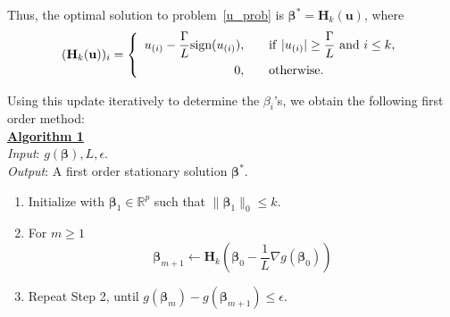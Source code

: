 \documentclass[12pt]{article}
\newcommand{\M}{\mathbf}
\newcommand{\MS}{\boldsymbol}
\newcommand{\R}{\mathbb{R}}
\newcommand{\1}{\mathds{1}}
\begin{document}
Thus, the optimal solution to problem~\ref{u_prob} is $\MS \beta^* = \M H_k(\M u)$, where
\begin{equation}
(\M H_k(\M u))_i = \left\{\begin{array}{rl} 
u_{(i)} - \displaystyle \frac{\Gamma}{L}\text{sign}(u_{(i)}), &~~~{\rm if}~|u_{(i)}| \ge \displaystyle \frac{\Gamma}{L}~{\rm and}~i \le k, \vspace{5pt}\\
0, &~~~\rm{otherwise.}
\end{array} \right.
\end{equation}

Using this update iteratively to determine the $\beta_i$'s, we obtain the following first order method:\\

\underline{\bf Algorithm 1}\\

\emph{Input}: $g(\MS \beta), L, \epsilon$.\\

\emph{Output}: A first order stationary solution $\MS \beta^*$.

\begin{enumerate}
	\item Initialize with $\MS \beta_1 \in \R^p$ such that $\|\MS \beta_1\|_0 \le k$.
	\item For $m \ge 1$
	\[
	\MS \beta_{m+1} \leftarrow \M H_k(\MS \beta_0 - \frac{1}{L} \nabla g(\MS \beta_0))
	\]
	\item Repeat Step 2, until $g(\MS \beta_m) - g(\MS \beta_{m+1}) \le \epsilon$.
\end{enumerate}
\end{document}
